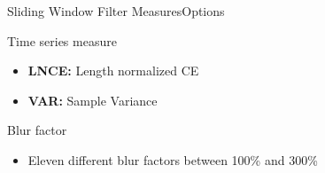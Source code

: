 \begin{frame}{Sliding Window Filter Measures}{Options}
    \begin{block}{Time series measure}
        \begin{itemize}
            \item \textbf{LNCE:} Length normalized CE
            \pause
            \item \textbf{VAR:} Sample Variance
            \pause
        \end{itemize}
    \end{block}
    \begin{block}{Blur factor}
        \begin{itemize}
            \item Eleven different blur factors between 100\% and 300\%
        \end{itemize}
    \end{block}
\end{frame}
